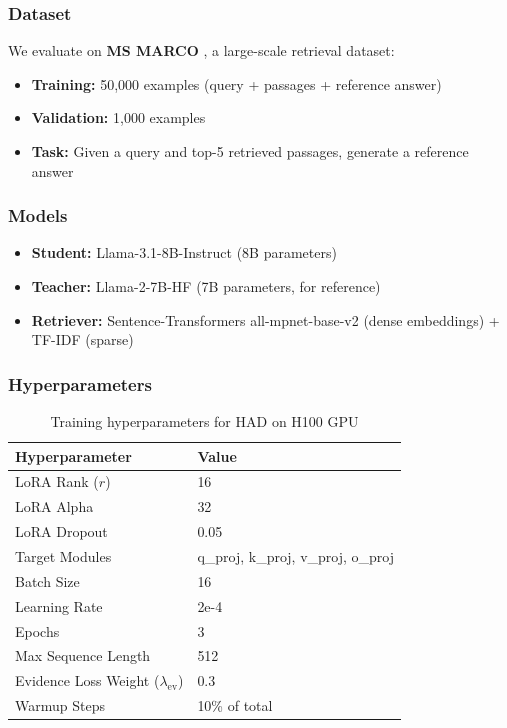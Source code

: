 \documentclass[11pt,a4paper]{article}
\begin{document}
\subsubsection{Dataset}

We evaluate on \textbf{MS MARCO} \cite{ms_marco}, a large-scale retrieval dataset:
\begin{itemize}
    \item \textbf{Training:} 50,000 examples (query + passages + reference answer)
    \item \textbf{Validation:} 1,000 examples
    \item \textbf{Task:} Given a query and top-5 retrieved passages, generate a reference answer
\end{itemize}

\subsubsection{Models}

\begin{itemize}
    \item \textbf{Student:} Llama-3.1-8B-Instruct (8B parameters)
    \item \textbf{Teacher:} Llama-2-7B-HF (7B parameters, for reference)
    \item \textbf{Retriever:} Sentence-Transformers all-mpnet-base-v2 (dense embeddings) + TF-IDF (sparse)
\end{itemize}

\subsubsection{Hyperparameters}

\begin{table}[H]
\centering
\begin{tabular}{ll}
\toprule
\textbf{Hyperparameter} & \textbf{Value} \\
\midrule
LoRA Rank ($r$) & 16 \\
LoRA Alpha & 32 \\
LoRA Dropout & 0.05 \\
Target Modules & q\_proj, k\_proj, v\_proj, o\_proj \\
Batch Size & 16 \\
Learning Rate & 2e-4 \\
Epochs & 3 \\
Max Sequence Length & 512 \\
Evidence Loss Weight ($\lambda_{\text{ev}}$) & 0.3 \\
Warmup Steps & 10\% of total \\
\bottomrule
\end{tabular}
\caption{Training hyperparameters for HAD on H100 GPU}
\end{table}
\end{document}
